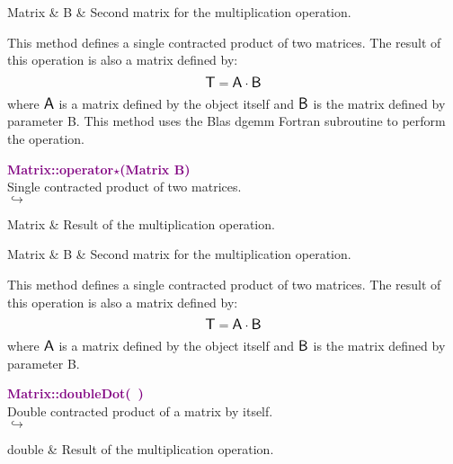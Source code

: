 \begin{tcolorbox}[width=\textwidth,myArgs,tabularx={ll|R}]
Matrix & B & Second matrix for the multiplication operation.
\end{tcolorbox}

This method defines a single contracted product of two matrices.
The result of this operation is also a matrix defined by:
\begin{equation*}
\mbox{\large\ensuremath{\mathsf{T}}} = \mbox{\large\ensuremath{\mathsf{A}}} \cdot \mbox{\large\ensuremath{\mathsf{B}}}
\end{equation*}
where $\mbox{\large\ensuremath{\mathsf{A}}}$ is a matrix defined by the object itself and $\mbox{\large\ensuremath{\mathsf{B}}}$ is the matrix defined by parameter B.
This method uses the Blas \textsf{dgemm} Fortran subroutine to perform the operation.

\textcolor{purple}{\textbf{Matrix::operator$\star$(Matrix B)}}\label{Matrix::operator*(Matrix B)}\\
Single contracted product of two matrices.\\ \hspace*{5mm}$\hookrightarrow$
\vspace*{-2em}\begin{tcolorbox}[grow to left by=-1cm, width=\textwidth-1cm,myArgs,tabularx={l|R}]
Matrix & Result of the multiplication operation.
\end{tcolorbox}

\begin{tcolorbox}[width=\textwidth,myArgs,tabularx={ll|R}]
Matrix & B & Second matrix for the multiplication operation.
\end{tcolorbox}

This method defines a single contracted product of two matrices.
The result of this operation is also a matrix defined by:
\begin{equation*}
\mbox{\large\ensuremath{\mathsf{T}}} = \mbox{\large\ensuremath{\mathsf{A}}} \cdot \mbox{\large\ensuremath{\mathsf{B}}}
\end{equation*}
where $\mbox{\large\ensuremath{\mathsf{A}}}$ is a matrix defined by the object itself and $\mbox{\large\ensuremath{\mathsf{B}}}$ is the matrix defined by parameter B.

\textcolor{purple}{\textbf{Matrix::doubleDot(~)}}\label{Matrix::doubleDot()}\\
Double contracted product of a matrix by itself.\\ \hspace*{5mm}$\hookrightarrow$
\vspace*{-2em}\begin{tcolorbox}[grow to left by=-1cm, width=\textwidth-1cm,myArgs,tabularx={l|R}]
double & Result of the multiplication operation.
\end{tcolorbox}

